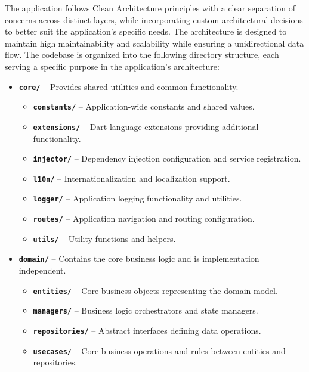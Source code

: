 The application follows Clean Architecture principles with a clear separation of concerns across distinct layers, while incorporating custom architectural decisions to better suit the application's specific needs. The architecture is designed to maintain high maintainability and scalability while ensuring a unidirectional data flow. The codebase is organized into the following directory structure, each serving a specific purpose in the application's architecture:

\begin{itemize}
    \item \textbf{\texttt{core/}} – Provides shared utilities and common functionality.
    \begin{itemize}
        \item \textbf{\texttt{constants/}} – Application-wide constants and shared values.
        \item \textbf{\texttt{extensions/}} – Dart language extensions providing additional functionality.
        \item \textbf{\texttt{injector/}} – Dependency injection configuration and service registration.
        \item \textbf{\texttt{l10n/}} – Internationalization and localization support.
        \item \textbf{\texttt{logger/}} – Application logging functionality and utilities.
        \item \textbf{\texttt{routes/}} – Application navigation and routing configuration.
        \item \textbf{\texttt{utils/}} – Utility functions and helpers.
    \end{itemize}

    \item \textbf{\texttt{domain/}} – Contains the core business logic and is implementation independent.
    \begin{itemize}
        \item \textbf{\texttt{entities/}} – Core business objects representing the domain model.
        \item \textbf{\texttt{managers/}} – Business logic orchestrators and state managers.
        \item \textbf{\texttt{repositories/}} – Abstract interfaces defining data operations.
        \item \textbf{\texttt{usecases/}} – Core business operations and rules between entities and repositories.
    \end{itemize}
    

\end{itemize}
